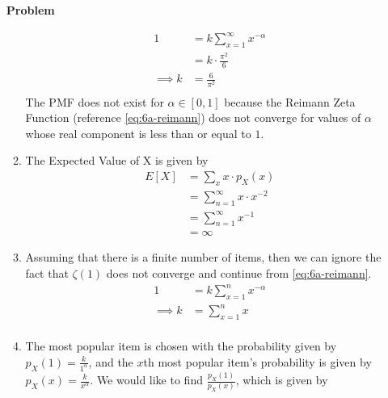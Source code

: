\documentclass[12pt]{article}
\newenvironment{Ex}{\textbf{Problem}\vspace{.75em}\\}{}
\begin{document}
\begin{enumerate}
\begin{Ex}
\begin{solution}
\begin{enumerate}
          \begin{equation}
            \label{eq:6a-sol}
            \begin{aligned}
              1 &= k \sum_{x=1}^\infty x^{-\alpha} \\
              &= k \cdot \frac{\pi^2}{6} \\
              \implies k &= \frac{6}{\pi^2} \\
            \end{aligned}
          \end{equation}
          The PMF does not exist for $\alpha \in [0,1]$ because the
          Reimann Zeta Function (reference \cref{eq:6a-reimann}) does
          not converge for values of $\alpha$ whose real component is
          less than or equal to $1$.
        \item The Expected Value of X is given by
          \begin{equation}
            \label{eq:6b-sol}
            \begin{aligned}
              E[X] &= \sum_x x \cdot p_X(x) \\
              &= \sum_{n=1}^\infty x \cdot x^{-2} \\
              &= \sum_{n=1}^\infty x^{-1} \\
              &= \infty
            \end{aligned}
          \end{equation}
        \item Assuming that there is a finite number of items, then we
          can ignore the fact that $\zeta(1)$ does not converge and
          continue from \cref{eq:6a-reimann}.
          \begin{equation}
            \label{eq:6c-sol}
            \begin{aligned}
              1 &= k \sum_{x=1}^n x^{-\alpha} \\
              \implies k &= \sum_{x=1}^n x \\
            \end{aligned}
          \end{equation}
        \item The most popular item is chosen with the probability given
          by $p_X(1) = \frac{k}{1^{\alpha}}$, and the $x$th most
          popular item's probability is given by
          $p_X(x) = \frac{k}{x^{\alpha}}$. We would like to find
          $\frac{p_X(1)}{p_X(x)}$, which is given by
          \begin{equation}
            \label{eq:6d-sol-reg}

\end{equation}
\end{enumerate}
\end{solution}
\end{Ex}
\end{enumerate}
\end{document}
